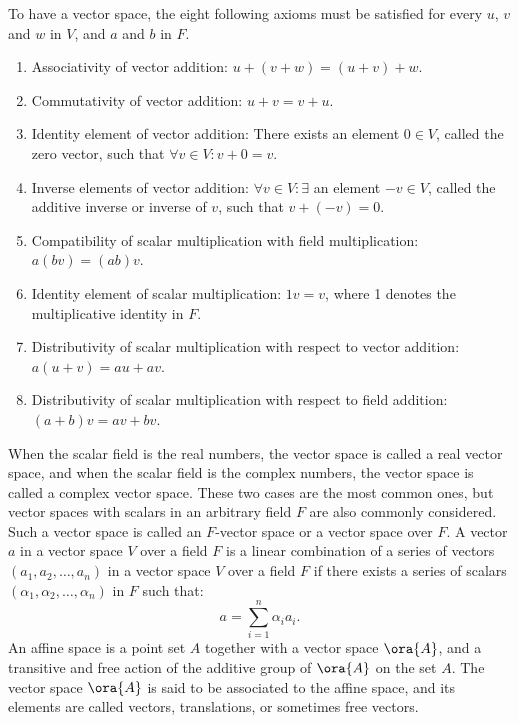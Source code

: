 \documentclass[a4paper,12pt]{report}
\begin{document}
To have a vector space, the eight following axioms must be satisfied for every $u$, $v$ and $w$ in $V$, and $a$ and $b$ in $F$.
\begin{enumerate}
\item Associativity of vector addition: $u + (v + w) = (u + v) + w$.
\item Commutativity of vector addition: $u + v = v + u$.
\item Identity element of vector addition: There exists an element $ 0 \in V$, called the zero vector, such that $\forall v\in V\colon v+ 0=v$.
\item Inverse elements of vector addition: $\forall v\in V\colon \exists$ an element $-v\in V$, called the additive inverse or inverse of $v$, such that $v + (−v) = 0$.
\item Compatibility of scalar multiplication with field multiplication: $a(bv) = (ab)v$.
\item Identity element of scalar multiplication: $1v = v$, where 1 denotes the multiplicative identity in $F$.
\item Distributivity of scalar multiplication with respect to vector addition: $a(u + v) = au + av$.
\item Distributivity of scalar multiplication with respect to field addition: $(a + b)v = av + bv$.
\end{enumerate}
When the scalar field is the real numbers, the vector space is called a real vector space, and when the scalar field is the complex numbers, the vector space is called a complex vector space. These two cases are the most common ones, but vector spaces with scalars in an arbitrary field $F$ are also commonly considered. Such a vector space is called an $F$-vector space or a vector space over $F$.
A vector $a$ in a vector space $V$ over a field $F$ is a linear combination of a series of vectors $(a_1,a_2,\ldots,a_n)$ in a vector space $V$ over a field $F$ if there exists a series of scalars $(\alpha_1,\alpha_2,\ldots,\alpha_n)$ in $F$ such that:
\[a=\sum_{i=1}^n\alpha_ia_i.\]
An affine space is a point set $A$ together with a vector space $\ora{A}$, and a transitive and free action of the additive group of $\ora{A}$ on the set $A$. The vector space $\ora{A}$ is said to be associated to the affine space, and its elements are called vectors, translations, or sometimes free vectors.
\end{document}
